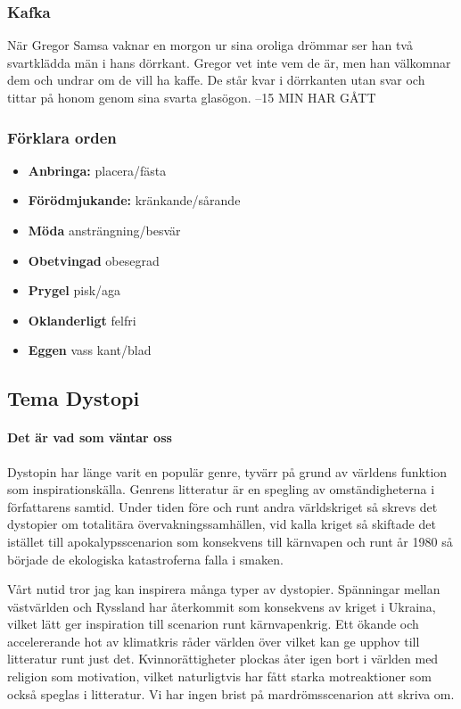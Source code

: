 \subsubsection{Kafka}
När Gregor Samsa vaknar en morgon ur sina oroliga drömmar ser han två svartklädda män i hans dörrkant. Gregor vet inte vem de är, men han välkomnar dem och undrar om de vill ha kaffe. De står kvar i dörrkanten utan svar och tittar på honom genom sina svarta glasögon. --15 MIN HAR GÅTT

\subsubsection{Förklara orden}
\begin{itemize}
	\item \textbf{Anbringa:} placera/fästa
	\item \textbf{Förödmjukande:} kränkande/sårande
	\item \textbf{Möda} ansträngning/besvär
	\item \textbf{Obetvingad} obesegrad
	\item \textbf{Prygel} pisk/aga
	\item \textbf{Oklanderligt} felfri
	\item \textbf{Eggen} vass kant/blad
\end{itemize}

\newpage
\subsection{Tema Dystopi}

\paragraph{Det är vad som väntar oss}

Dystopin har länge varit en populär genre, tyvärr på grund av världens funktion som inspirationskälla. Genrens litteratur är en spegling av omständigheterna i författarens samtid. Under tiden före och runt andra världskriget så skrevs det dystopier om totalitära övervakningssamhällen, vid kalla kriget så skiftade det istället till apokalypsscenarion som konsekvens till kärnvapen och runt år 1980 så började de ekologiska katastroferna falla i smaken.

Vårt nutid tror jag kan inspirera många typer av dystopier. Spänningar mellan västvärlden och Ryssland har återkommit som konsekvens av kriget i Ukraina, vilket lätt ger inspiration till scenarion runt kärnvapenkrig. Ett ökande och accelererande hot av klimatkris råder världen över vilket kan ge upphov till litteratur runt just det. Kvinnorättigheter plockas åter igen bort i världen med religion som motivation, vilket naturligtvis har fått starka motreaktioner som också speglas i litteratur. Vi har ingen brist på mardrömsscenarion att skriva om.

